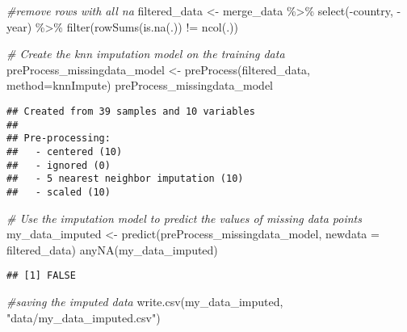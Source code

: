 \documentclass[
]{article}
\newenvironment{Shaded}{\begin{snugshade}}{\end{snugshade}}
\newcommand{\AttributeTok}[1]{\textcolor[rgb]{0.77,0.63,0.00}{#1}}
\newcommand{\CommentTok}[1]{\textcolor[rgb]{0.56,0.35,0.01}{\textit{#1}}}
\newcommand{\FunctionTok}[1]{\textcolor[rgb]{0.00,0.00,0.00}{#1}}
\newcommand{\NormalTok}[1]{#1}
\newcommand{\OtherTok}[1]{\textcolor[rgb]{0.56,0.35,0.01}{#1}}
\newcommand{\SpecialCharTok}[1]{\textcolor[rgb]{0.00,0.00,0.00}{#1}}
\newcommand{\StringTok}[1]{\textcolor[rgb]{0.31,0.60,0.02}{#1}}
\begin{document}
\begin{Shaded}
\begin{Highlighting}[]
\CommentTok{\#remove rows with all na}
\NormalTok{filtered\_data }\OtherTok{\textless{}{-}}\NormalTok{ merge\_data }\SpecialCharTok{\%\textgreater{}\%}
  \FunctionTok{select}\NormalTok{(}\SpecialCharTok{{-}}\NormalTok{country, }\SpecialCharTok{{-}}\NormalTok{year) }\SpecialCharTok{\%\textgreater{}\%}
  \FunctionTok{filter}\NormalTok{(}\FunctionTok{rowSums}\NormalTok{(}\FunctionTok{is.na}\NormalTok{(.)) }\SpecialCharTok{!=} \FunctionTok{ncol}\NormalTok{(.))}
\end{Highlighting}
\end{Shaded}

\begin{Shaded}
\begin{Highlighting}[]
\CommentTok{\# Create the knn imputation model on the training data}
\NormalTok{preProcess\_missingdata\_model }\OtherTok{\textless{}{-}} \FunctionTok{preProcess}\NormalTok{(filtered\_data, }\AttributeTok{method=}\StringTok{\textquotesingle{}knnImpute\textquotesingle{}}\NormalTok{)}
\NormalTok{preProcess\_missingdata\_model}
\end{Highlighting}
\end{Shaded}

\begin{verbatim}
## Created from 39 samples and 10 variables
## 
## Pre-processing:
##   - centered (10)
##   - ignored (0)
##   - 5 nearest neighbor imputation (10)
##   - scaled (10)
\end{verbatim}

\begin{Shaded}
\begin{Highlighting}[]
\CommentTok{\# Use the imputation model to predict the values of missing data points}
\NormalTok{my\_data\_imputed }\OtherTok{\textless{}{-}} \FunctionTok{predict}\NormalTok{(preProcess\_missingdata\_model, }\AttributeTok{newdata =}\NormalTok{ filtered\_data)}
\FunctionTok{anyNA}\NormalTok{(my\_data\_imputed)}
\end{Highlighting}
\end{Shaded}

\begin{verbatim}
## [1] FALSE
\end{verbatim}

\begin{Shaded}
\begin{Highlighting}[]
\CommentTok{\#saving the imputed data}
\FunctionTok{write.csv}\NormalTok{(my\_data\_imputed, }\StringTok{"data/my\_data\_imputed.csv"}\NormalTok{)}
\end{Highlighting}
\end{Shaded}
\end{document}
